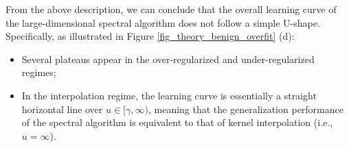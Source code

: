 \documentclass{article}
\theoremstyle{plain}
\theoremstyle{definition}
\theoremstyle{remark}
\newtheorem{remark}[theorem]{Remark}
\newcommand{\green}{\color{green}}
\newcommand{\dhnote}[1]{{\color{red}[#1]} } %
\begin{document}

From the above description, we can conclude that the overall learning curve of the large-dimensional spectral algorithm does not follow a simple U-shape. Specifically,  as illustrated in Figure \ref{fig_theory_benign_overfit} (d):
\begin{itemize}
    \item Several plateaus appear in the over-regularized and under-regularized regimes;

    \vspace{3pt}
    
    \item In the interpolation regime, the learning curve is essentially a straight horizontal line over $u\in [\gamma, \infty)$, meaning that the generalization performance of the spectral algorithm is equivalent to that of kernel interpolation (i.e., $u=\infty$).
\end{itemize}




\end{document}
